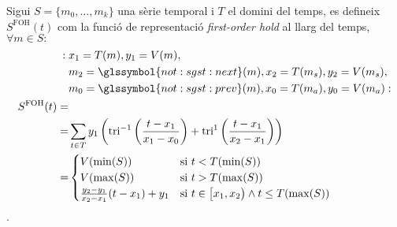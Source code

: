 \begin{definition}
  Sigui $S=\{m_0,\ldots,m_k\}$ una sèrie temporal i $T$ el domini del
  temps, es defineix $S^\text{FOH}(t)$ com la funció de representació
  \emph{first-order hold} al llarg del temps, $\forall m \in S:$
  \begin{align*}
    :\; & x_1=T(m), y_1=V(m), \\
    & m_2=\glssymbol{not:sgst:next}(m), x_2=T(m_s), y_2=V(m_s),\\
    & m_0=\glssymbol{not:sgst:prev}(m), x_0=T(m_a), y_0=V(m_a) :\\
    S^\text{FOH}(t) = & \\
    = & \sum_{t\in T} y_1
    \left(
      \operatorname{tri}^{-1}\left(\frac{t-x_1}{x_1-x_0}\right)
      +\operatorname{tri}^1\left(\frac{t-x_1}{x_2-x_1}\right)
    \right)  \\
    = & \begin{cases}
      V(\min(S)) & \text{si } t<T(\min(S) )\\
      V(\max(S)) & \text{si } t> T(\max(S))  \\
      \frac{y_2-y_1}{x_2-x_1}(t-x_1)+y_1 & \text{si } t\in
      \big[x_1,x_2\big) \wedge t \leq T(\max(S))
    \end{cases}
  \end{align*}.
\end{definition}




